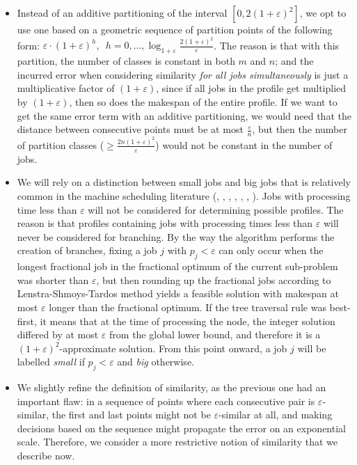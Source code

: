 \documentclass[moor,sglanonrev]{informs4}
\theoremstyle{plain}
\begin{document}
\begin{itemize}

    \item Instead of an additive partitioning of the interval $[0,2(1+\varepsilon)^2]$, we opt to use one based on a geometric sequence of partition points of the following form: $\varepsilon \cdot (1+\varepsilon)^h, \,\,\, h = 0, \ldots , \log_{1+\varepsilon} \frac{2(1+\varepsilon)^2}{\varepsilon}$. The reason is that with this partition, the number of classes is constant in both $m$ and $n$; and the incurred error when considering similarity \emph{for all jobs simultaneously} is just a multiplicative factor of $(1+\varepsilon)$, since if all jobs in the profile get multiplied by $(1+\varepsilon)$, then so does the makespan of the entire profile. If we want to get the same error term with an additive partitioning, we would need that the distance between consecutive points must be at most $\frac{\varepsilon}{n}$, but then the number of partition classes ($\ge \frac{2n(1+\varepsilon)^2}{\varepsilon}$) would not be constant in the number of jobs.

    \item We will rely on a distinction between small jobs and big jobs that is relatively common in the machine scheduling literature (\cite{grouping_1}, \cite{JansenM04}, \cite{grouping_2}, \cite{Mastrolilli03}, \cite{Mastrolilli04}, \cite{Mastrolilli06}, \cite{MastrolilliH06}). Jobs with processing time less than $\varepsilon$ will not be considered for determining possible profiles. The reason is that profiles containing jobs with processing times less than $\varepsilon$ will never be considered for branching. By the way the algorithm performs the creation of branches, fixing a job $j$ with $p_j < \varepsilon$ can only occur when the longest fractional job in the fractional optimum of the current sub-problem was shorter than $\varepsilon$, but then rounding up the fractional jobs according to Lenstra-Shmoys-Tardos method yields a feasible solution with makespan at most $\varepsilon$ longer than the fractional optimum. If the tree traversal rule was best-first, it means that at the time of processing the node, the integer solution differed by at most $\varepsilon$ from the global lower bound, and therefore it is a $(1+\varepsilon)^2$-approximate solution. From this point onward, a job $j$ will be labelled \emph{small} if $p_j < \varepsilon$ and \emph{big} otherwise.

    \item We slightly refine the definition of similarity, as the previous one had an important flaw: in a sequence of points where each consecutive pair is $\varepsilon$-similar, the first and last points might not be $\varepsilon$-similar at all, and making decisions based on the sequence might propagate the error on an exponential scale. Therefore, we consider a more restrictive notion of similarity that we describe now.
\end{itemize}
\end{document}
